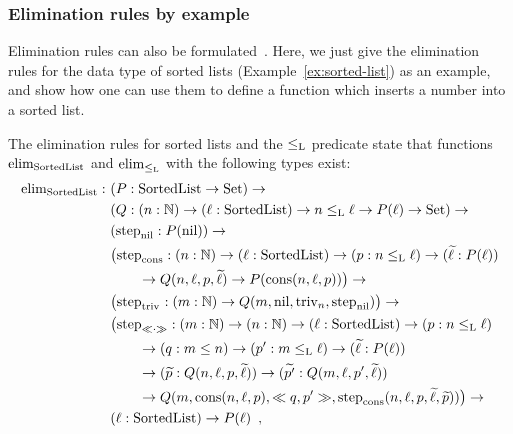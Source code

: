 \documentclass{article}
\begin{document}
\subsubsection{Elimination rules by example}
\label{sec:elim}

Elimination rules can also be
formulated~\cite{nordvallforsbergAltenkirchMorrisSetzer2011catsemindind}. Here,
we just give the elimination rules for the data type of sorted lists
(Example~\ref{ex:sorted-list}) as an example, and show how one can use them to
define a function which inserts a number into a sorted list.

\begin{example}
  The elimination rules for sorted lists and the $\leq_{\text{L}}$ predicate
  state that functions $\text{elim}_{\text{SortedList}}$ and $\text{elim}_{\leq_{\text{L}}}$
  with the following types exist:
  \begin{align*}
    \elim_{\SortedList} :\ & (P : \SortedList \to \Set) \to \\
                       & (Q : (n : \Nat) \to (\ell : \SortedList) \to n \lessList \ell \to P(\ell) \to \Set) \to \\
                       & (\stepind{\nilList} : P(\nilList)) \to \\
                       & \big(\stepind{\consListbare} : (n : \Nat) \to (\ell : \SortedList) \to (p : n \lessList \ell) \to (\stepindarg{\ell} : P(\ell)) \\
                       & \qquad \to Q(n, \ell, p, \stepindarg{\ell}) \to P(\consList{n}{\ell}{p})\big) \to \\
                       & \big(\stepind{\nilLess{}} : (m : \Nat) \to Q(m, \nilList, \nilLess{n}, \stepind{\nilList})\big) \to \\
                       & \big(\stepind{\consLessbare} : (m : \Nat) \to (n : \Nat) \to (\ell : \SortedList) \to (p : n \lessList \ell) \\
                       & \qquad \to (q : m \leq n) \to (p' : m \lessList \ell) \to
                       (\stepindarg{\ell} : P(\ell)) \\ 
                       & \qquad \to (\stepindarg{p} : Q(n, \ell,p, \stepindarg{\ell}))
                       \to (\stepindarg{p'} : Q(m, \ell, p', \stepindarg{\ell})) \\
                       & \qquad \to Q(m,\consList{n}{\ell}{p}, \consLess{m}{n}{\ell}{p}{q}{p'}, \stepind{\consListbare}(n, \ell, p, \stepindarg{\ell}, \stepindarg{p}))\big) \to \\
                       & (\ell : \SortedList) \to P(\ell) \enspace , \\

\end{align*}
\end{example}
\end{document}
